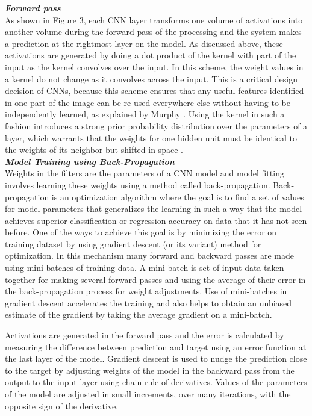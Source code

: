 \documentclass [11pt,letterpaper ,twoside ,openany ]{report}
\begin{document}
    \noindent
    \textbf{\textit{Forward pass}}\\
    As shown in Figure 3, each CNN layer transforms one volume of activations into another volume during the forward pass of the processing and the system makes a prediction at the rightmost layer on the model. As discussed above, these activations are generated by doing a dot product of the kernel with part of the input as the kernel convolves over the input. In this scheme, the weight values in a kernel do not change as it convolves across the input. This is a critical design decision of CNNs, because this scheme ensures that any useful features identified in one part of the image can be re-used everywhere else without having to be independently learned, as explained by Murphy \cite{Murphy2012}. Using the kernel in such a fashion introduces a strong prior probability distribution over the parameters of a layer, which warrants that the weights for one hidden unit must be identical to the weights of its neighbor but shifted in space \cite{Goodfellow-et-al-2016}.\\

    \noindent
    \textbf{\textit{Model Training using Back-Propagation}} \\
    Weights in the filters are the parameters of a CNN model and model fitting involves learning these weights using a method called back-propagation. Back-propagation is an optimization algorithm where the goal is to find a set of values for model parameters that generalizes the learning in such a way that the model achieves superior classification or regression accuracy on data that it has not seen before. One of the ways to achieve this goal is by minimizing the error on training dataset by using gradient descent (or its variant) method for optimization. In this mechanism many forward and backward passes are made using mini-batches of training data. A mini-batch is set of input data taken together for making several forward passes and using the average of their error in the back-propagation process for weight adjustments. Use of mini-batches in gradient descent accelerates the training and also helps to obtain an unbiased estimate of the gradient by taking the average gradient on a mini-batch. 

    Activations are generated in the forward pass and the error is calculated by measuring the difference between prediction and target using an error function at the last layer of the model. Gradient descent is used to nudge the prediction close to the target by adjusting weights of the model in the backward pass from the output to the input layer using chain rule of derivatives. Values of the parameters of the model are adjusted in small increments, over many iterations, with the opposite sign of the derivative.
\end{document}
